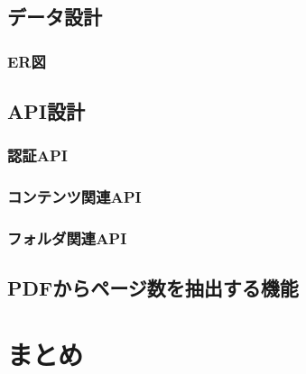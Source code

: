 \subsection{データ設計}
\subsubsection{ER図}

\subsection{API設計}
\subsubsection{認証API}
\subsubsection{コンテンツ関連API}
\subsubsection{フォルダ関連API}

\subsection{PDFからページ数を抽出する機能}

\section{まとめ}

